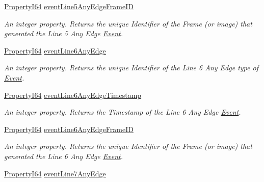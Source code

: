 \begin{DoxyCompactItemize}
\hyperlink{group___common_interface_ga81749b2696755513663492664a18a893}{Property\+I64} \hyperlink{classmv_i_m_p_a_c_t_1_1acquire_1_1_gen_i_cam_1_1_event_control_a13926486b4e9a3cc389f790a4dcaee2e}{event\+Line5\+Any\+Edge\+Frame\+I\+D}
\begin{DoxyCompactList}\small\item\em An integer property. Returns the unique Identifier of the Frame (or image) that generated the Line 5 Any Edge \hyperlink{classmv_i_m_p_a_c_t_1_1acquire_1_1_event}{Event}. \end{DoxyCompactList}\item 
\hyperlink{group___common_interface_ga81749b2696755513663492664a18a893}{Property\+I64} \hyperlink{classmv_i_m_p_a_c_t_1_1acquire_1_1_gen_i_cam_1_1_event_control_a131486ed05e1cc3a241adda47383df61}{event\+Line6\+Any\+Edge}
\begin{DoxyCompactList}\small\item\em An integer property. Returns the unique Identifier of the Line 6 Any Edge type of \hyperlink{classmv_i_m_p_a_c_t_1_1acquire_1_1_event}{Event}. \end{DoxyCompactList}\item 
\hyperlink{group___common_interface_ga81749b2696755513663492664a18a893}{Property\+I64} \hyperlink{classmv_i_m_p_a_c_t_1_1acquire_1_1_gen_i_cam_1_1_event_control_ad77d1afc284411afe65eba9c8cf8e9c8}{event\+Line6\+Any\+Edge\+Timestamp}
\begin{DoxyCompactList}\small\item\em An integer property. Returns the Timestamp of the Line 6 Any Edge \hyperlink{classmv_i_m_p_a_c_t_1_1acquire_1_1_event}{Event}. \end{DoxyCompactList}\item 
\hyperlink{group___common_interface_ga81749b2696755513663492664a18a893}{Property\+I64} \hyperlink{classmv_i_m_p_a_c_t_1_1acquire_1_1_gen_i_cam_1_1_event_control_a10c633ee42ced09446980728eba1ecb4}{event\+Line6\+Any\+Edge\+Frame\+I\+D}
\begin{DoxyCompactList}\small\item\em An integer property. Returns the unique Identifier of the Frame (or image) that generated the Line 6 Any Edge \hyperlink{classmv_i_m_p_a_c_t_1_1acquire_1_1_event}{Event}. \end{DoxyCompactList}\item 
\hyperlink{group___common_interface_ga81749b2696755513663492664a18a893}{Property\+I64} \hyperlink{classmv_i_m_p_a_c_t_1_1acquire_1_1_gen_i_cam_1_1_event_control_acdd1accf26999051fc3c90321d00a9c2}{event\+Line7\+Any\+Edge}

\end{DoxyCompactItemize}
